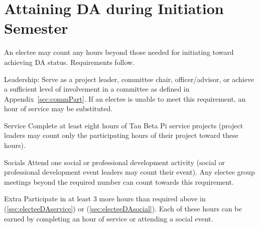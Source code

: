 \section{Attaining DA during Initiation Semester} An electee may count any hours beyond those needed for initiating toward achieving DA status. Requirements follow.
\begin{enumsubsection}
\item{Leadership:} Serve as a project leader, committee chair,  officer/advisor, or achieve a sufficient level of involvement in a committee as defined in Appendix~\ref{sec:commPart}. If an electee is unable to meet this requirement, an hour of service may be substituted.
\item{Service}\label{sec:electeeDAservice} Complete at least eight hours of Tau Beta Pi service projects (project leaders may count only the participating hours of their project toward these hours). 
\item{Socials} \label{sec:electeeDAsocial} Attend one social or professional development activity (social or professional development event leaders may count their event). Any electee group meetings beyond the required number can count towards this requirement.
\item{Extra} Participate in at least 3 more hours than required above in (\ref{sec:electeeDAservice}) or (\ref{sec:electeeDAsocial}). Each of these hours can be earned by completing an hour of service or attending a social event.
\end{enumsubsection}

